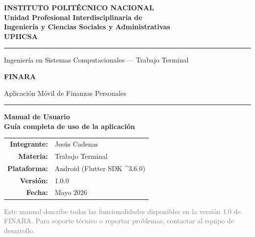 \documentclass[a4paper,12pt]{report}
\begin{document}
\begin{titlepage}
  \pagestyle{empty}
  \centering
  \vspace*{1.5cm}

  {\Large\bfseries\color{azulipn}
    INSTITUTO POLITÉCNICO NACIONAL\\[0.3em]
    \normalsize Unidad Profesional Interdisciplinaria de\\
    Ingeniería y Ciencias Sociales y Administrativas\\[0.2em]
    UPIICSA
  }\par
  \vspace{0.5cm}
  \textcolor{azulipn}{\rule{0.7\textwidth}{0.8pt}}\par
  \vspace{0.4cm}
  {\small Ingeniería en Sistemas Computacionales — Trabajo Terminal}\par

  \vspace{1.6cm}
  {\Huge\bfseries\color{verdefinara} FINARA}\par
  \vspace{0.3cm}
  {\large\color{gristexto} Aplicación Móvil de Finanzas Personales}\par
  \vspace{1.2cm}
  \textcolor{azulipn!30}{\rule{0.5\textwidth}{0.4pt}}\par
  \vspace{0.8cm}

  {\LARGE\bfseries Manual de Usuario\\[0.2em]
   \large\normalfont Guía completa de uso de la aplicación}\par

  \vspace{1.4cm}
  \begin{tabular}{rl}
    \textbf{Integrante:}   & Jesús Cadenas \\[4pt]
    \textbf{Materia:}      & Trabajo Terminal \\[4pt]
    \textbf{Plataforma:}   & Android (Flutter SDK \textasciicircum 3.6.0) \\[4pt]
    \textbf{Versión:}      & 1.0.0 \\[4pt]
    \textbf{Fecha:}        & Mayo 2026 \\
  \end{tabular}

  \vfill
  \textcolor{gray}{\footnotesize
    Este manual describe todas las funcionalidades disponibles en la
    versión 1.0 de FINARA. Para soporte técnico o reportar problemas,
    contactar al equipo de desarrollo.
  }
\end{titlepage}
\end{document}
